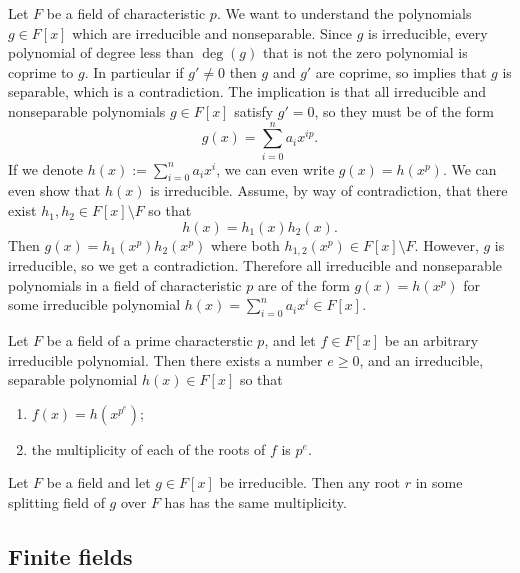 \documentclass[11pt,a4paper]{article}
\begin{document}
\begin{remark}
  Let $F$ be a field of characteristic $p$.
  We want to understand the polynomials $g \in F[x]$
  which are irreducible and nonseparable.
  Since $g$ is irreducible,
  every polynomial of degree less than $\deg(g)$ that is not
  the zero polynomial is coprime to $g$.
  In particular if $g' \neq 0$ then $g$ and $g'$ are coprime,
  so  implies that $g$ is separable,
  which is a contradiction.
  The implication is that all irreducible and nonseparable
  polynomials $g \in F[x]$ satisfy $g' = 0$, so they must
  be of the form
  \[
    g(x) = \sum_{i=0}^{n} a_i x^{ip}.
  \]
  If we denote $h(x) := \sum_{i=0}^{n} a_i x^i$,
  we can even write $g(x) = h(x^p)$.
  We can even show that $h(x)$ is irreducible.
  Assume, by way of contradiction,
  that there exist $h_1,h_2 \in F[x] \setminus F$ so that
  \[
    h(x) = h_1(x) h_2(x).
  \]
  Then $g(x) = h_1(x^p) h_2(x^p)$
  where both $h_{1,2}(x^p) \in F[x] \setminus F$.
  However, $g$ is irreducible, so we get a contradiction.
  Therefore all irreducible and nonseparable polynomials in a field
  of characteristic $p$ are of the form $g(x) = h(x^p)$
  for some irreducible polynomial $h(x) = \sum_{i=0}^{n} a_i x^i \in F[x]$.
\end{remark}

\begin{proposition}
  \label{prop:irreducible-in-prime-char-fields}
  Let $F$ be a field of a prime characterstic $p$,
  and let $f \in F[x]$ be an arbitrary irreducible polynomial.
  Then there exists a number $e \geq 0$,
  and an irreducible, separable polynomial
  $h(x) \in F[x]$ so that
  \begin{enumerate}
    \item[(1)] $f(x) = h(x^{p^e})$;
    \item[(2)] the multiplicity of each of the roots of $f$ is $p^e$.
  \end{enumerate}
\end{proposition}

\begin{corollary}
  Let $F$ be a field and let $g \in F[x]$ be  irreducible.
  Then any root $r$ in some splitting field of $g$ over $F$
  has has the same multiplicity.
\end{corollary}

\subsection{Finite fields}
\end{document}
